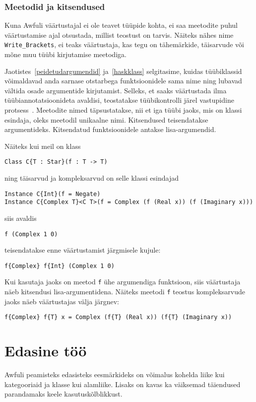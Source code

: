 \documentclass[12pt]{article}
\newcommand\peatykk[1]{
  \clearpage
  \section{#1}}
\begin{document}
      \subsubsection{Meetodid ja kitsendused}
        Kuna Awfuli väärtustajal ei ole teavet tüüpide kohta, ei saa meetodite puhul väärtustamise ajal otsustada, millist teostust on tarvis. Näiteks nähes nime \verb!Write_Brackets!, ei teaks väärtustaja, kas tegu on tähemärkide, täisarvude või mõne muu tüübi kirjutamise meetodiga.

        Jaotistes~\ref{peidetudargumendid} ja~\ref{haskklass} selgitasime, kuidas tüübiklassid võimaldavad anda sarnase otstarbega funktsioonidele sama nime ning lubavad vältida osade argumentide kirjutamist. Selleks, et saaks väärtustada ilma tüübiannotatsioonideta avaldisi, teostatakse tüübikontrolli järel vastupidine protsess~\cite{How}. Meetodite nimed täpsustatakse, nii et iga tüübi jaoks, mis on klassi esindaja, oleks meetodil unikaalne nimi. Kitsendused teisendatakse argumentideks. Kitsendatud funktsioonidele antakse lisa-argumendid.

        Näiteks kui meil on klass

        \begin{verbatim}Class C{T : Star}(f : T -> T)\end{verbatim}

        ning täisarvud ja kompleksarvud on selle klassi esindajad

        \begin{verbatim}Instance C{Int}(f = Negate)
Instance C{Complex T}<C T>(f = Complex (f (Real x)) (f (Imaginary x)))\end{verbatim}

        siis avaldis

        \begin{verbatim}f (Complex 1 0)\end{verbatim}

        teisendatakse enne väärtustamist järgmisele kujule:

        \begin{verbatim}f{Complex} f{Int} (Complex 1 0)\end{verbatim}

        Kui kasutaja jaoks on meetod \verb!f! ühe argumendiga funktsioon, siis väärtustaja näeb kitsendusi lisa-argumentidena. Näiteks meetodi \verb!f! teostus kompleksarvude jaoks näeb väärtustajas välja järgnev:

        \begin{verbatim}f{Complex} f{T} x = Complex (f{T} (Real x)) (f{T} (Imaginary x))\end{verbatim}
  \peatykk{Edasine töö}
    Awfuli peamisteks edasisteks eesmärkideks on võimalus kohelda liike kui kategooriaid ja klasse kui alamliike. Lisaks on kavas ka väiksemad täiendused parandamaks keele kasutuskõlblikkust.
\end{document}
